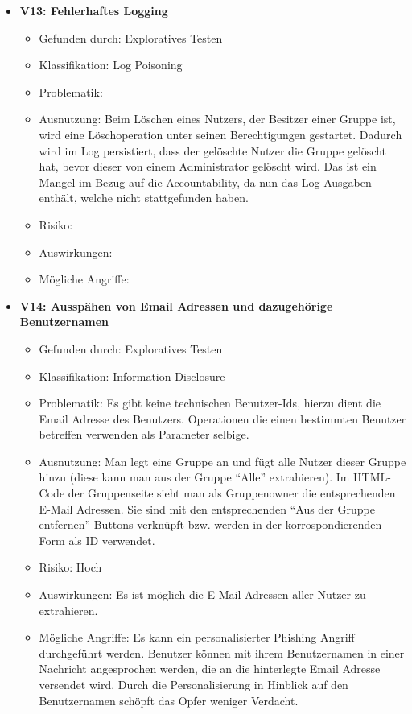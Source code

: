 \documentclass[12pt,DIV14,BCOR10mm,a4paper,parskip=half-,headsepline,headinclude,english,ngerman,bibliography=totocnumbered]{scrreprt}
\begin{document}
\begin{itemize}
  \hypertarget{vulnerability13}{}
  \item \textbf{V13: Fehlerhaftes Logging}
  \begin{itemize}
  \item Gefunden durch: Exploratives Testen
  \item Klassifikation: Log Poisoning
  \item Problematik:
  \item Ausnutzung: Beim Löschen eines Nutzers, der Besitzer einer Gruppe ist, wird eine Löschoperation unter seinen Berechtigungen gestartet. Dadurch wird im Log persistiert, dass der gelöschte Nutzer die Gruppe gelöscht hat, bevor dieser von einem Administrator gelöscht wird. Das ist ein Mangel im Bezug auf die Accountability, da nun das Log Ausgaben enthält, welche nicht stattgefunden haben.
  \item Risiko: 
  \item Auswirkungen: 
  \item Mögliche Angriffe:
  \end{itemize}

  \hypertarget{vulnerability14}{}
  \item \textbf{V14: Ausspähen von Email Adressen und dazugehörige Benutzernamen}
  \begin{itemize}
  \item Gefunden durch: Exploratives Testen
  \item Klassifikation: Information Disclosure
  \item Problematik: Es gibt keine technischen Benutzer-Ids, hierzu dient die Email Adresse des Benutzers. Operationen die einen bestimmten Benutzer betreffen verwenden als Parameter selbige.
  \item Ausnutzung: Man legt eine Gruppe an und fügt alle Nutzer dieser Gruppe hinzu (diese kann man aus der Gruppe \enquote{Alle} extrahieren). Im HTML-Code der Gruppenseite sieht man als Gruppenowner die entsprechenden E-Mail Adressen. Sie sind mit den entsprechenden \enquote{Aus der Gruppe entfernen} Buttons verknüpft bzw. werden in der korrospondierenden Form als ID verwendet.
  \item Risiko: Hoch
  \item Auswirkungen: Es ist möglich die E-Mail Adressen aller Nutzer zu extrahieren.
  \item Mögliche Angriffe: Es kann ein personalisierter Phishing Angriff durchgeführt werden. Benutzer können mit ihrem Benutzernamen in einer Nachricht angesprochen werden, die an die hinterlegte Email Adresse versendet wird. Durch die Personalisierung in Hinblick auf den Benutzernamen schöpft das Opfer weniger Verdacht.
  \end{itemize}


\end{itemize}
\end{document}
